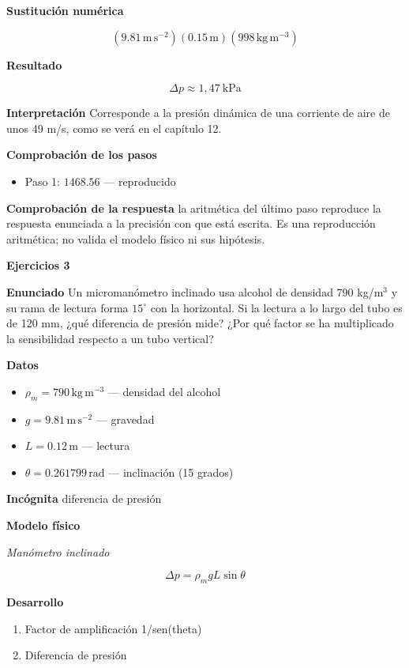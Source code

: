 \documentclass[10pt,openany]{book}
\begin{document}
\noindent\textbf{Sustitución numérica}

\[
\left(9.81\,\mathrm{m}\,\mathrm{s}^{-2}\right) \left(0.15\,\mathrm{m}\right) \left(998\,\mathrm{kg}\,\mathrm{m}^{-3}\right)
\]

\noindent\textbf{Resultado}

\[
\Delta p \approx 1{,}47\ \mathrm{kPa}
\]

\noindent\textbf{Interpretación}
Corresponde a la presión dinámica de una corriente de aire de unos 49 m/s, como se verá en el capítulo 12.

\noindent\textbf{Comprobación de los pasos}
\begin{itemize}
\item Paso 1: $1468.56$ — reproducido
\end{itemize}

\noindent\textbf{Comprobación de la respuesta} la aritmética del último paso reproduce la respuesta enunciada a la precisión con que está escrita. Es una reproducción aritmética; no valida el modelo físico ni sus hipótesis.

\noindent\textbf{Ejercicios 3}

\noindent\textbf{Enunciado}
Un micromanómetro inclinado usa alcohol de densidad 790 kg/m\(^3\) y su rama de lectura forma \(15^\circ\) con la horizontal. Si la lectura a lo largo del tubo es de 120 mm, ¿qué diferencia de presión mide? ¿Por qué factor se ha multiplicado la sensibilidad respecto a un tubo vertical?

\noindent\textbf{Datos}
\begin{itemize}
\item $\rho_{m} = 790\,\mathrm{kg}\,\mathrm{m}^{-3}$ — densidad del alcohol
\item $g = 9.81\,\mathrm{m}\,\mathrm{s}^{-2}$ — gravedad
\item $L = 0.12\,\mathrm{m}$ — lectura
\item $\theta = 0.261799\,\mathrm{rad}$ — inclinación (15 grados)
\end{itemize}

\noindent\textbf{Incógnita}
diferencia de presión

\noindent\textbf{Modelo físico}

\noindent\textit{Manómetro inclinado}

\[
\Delta p = \rho_m g L\sin\theta
\]

\noindent\textbf{Desarrollo}
\begin{enumerate}
\item
Factor de amplificación 1/sen(theta)
\item
Diferencia de presión
\end{enumerate}
\end{document}
